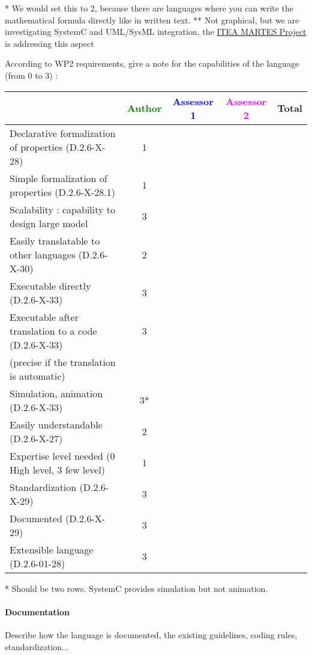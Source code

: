 \begin{author_comment}
* We would set this to 2, because there are languages where you can write the mathematical formula directly like in written text. 
** Not graphical, but we are investigating SystemC and UML/SysML integration, the \href{http://www.martes-idea.org/}{ITEA MARTES Project} is addressing this aspect
\end{author_comment}

According to WP2 requirements, give a note for the capabilities of the language (from 0 to 3) :

\begin{tabular}{|l | c | c | c | c|}
\hline
& \textcolor{green}{Author} & \textcolor{blue}{Assessor 1} & \textcolor{magenta}{Assessor 2} & Total \\
\hline
Declarative formalization of properties (D.2.6-X-28) &1 & & & \\
\hline
Simple formalization of properties (D.2.6-X-28.1) &1 & & & \\
\hline
Scalability : capability to design large model &3 & & & \\
\hline
Easily translatable to other languages (D.2.6-X-30) &2 & & & \\
\hline
Executable directly (D.2.6-X-33) &3 & & & \\
\hline
Executable after translation to a code (D.2.6-X-33) &3 & & & \\
(precise if the translation is automatic) & & & & \\
\hline
Simulation, animation (D.2.6-X-33) &3* & & & \\
\hline
Easily understandable (D.2.6-X-27) &2 & & & \\
\hline
Expertise level needed (0 High level, 3 few level) &1 & & & \\
\hline
Standardization (D.2.6-X-29) &3 & & & \\
\hline
Documented (D.2.6-X-29) &3 & & & \\
\hline
Extensible language (D.2.6-01-28) &3 & & & \\
\hline
\end{tabular}

\begin{author_comment}
* Should be two rows. SystemC provides simulation but not animation.
\end{author_comment}


\paragraph{Documentation} Describe how the language is documented, the existing guidelines, coding rules, standardization...

